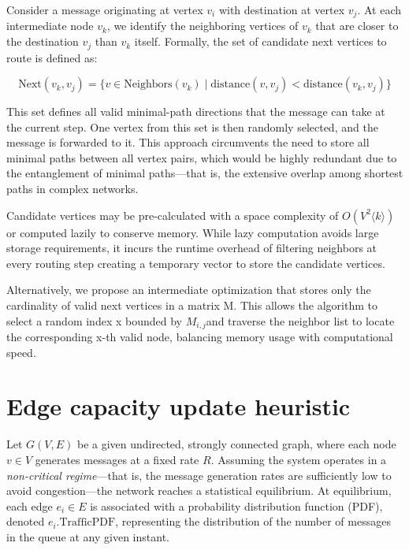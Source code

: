 \documentclass{article}
\begin{document}
Consider a message originating at vertex $ v_i $ with destination at vertex $ v_j $. At each intermediate node $ v_k $, we identify the neighboring vertices of $ v_k $ that are closer to the destination $ v_j $ than $ v_k $ itself. Formally, the set of candidate next vertices to route is defined as:

\begin{equation}
    \text{Next}(v_k, v_j) = \{v \in \text{Neighbors}(v_k) \mid \text{distance}(v, v_j) < \text{distance}(v_k, v_j)\}
\end{equation}

This set defines all valid minimal-path directions that the message can take at the current step. One vertex from this set is then randomly selected, and the message is forwarded to it.
This approach circumvents the need to store all minimal paths between all vertex pairs, which would be highly redundant due to the entanglement of minimal paths—that is, the extensive overlap among shortest paths in complex networks.

Candidate vertices may be pre-calculated with a space complexity of $O(V^2⟨k⟩)$ or computed lazily to conserve memory. While lazy computation avoids large storage requirements, it incurs the runtime overhead of filtering neighbors at every routing step creating a temporary vector to store the candidate vertices. 

Alternatively, we propose an intermediate optimization that stores only the cardinality of valid next vertices in a matrix M.  This allows the algorithm to select a random index x bounded by $M_{i,j}$​ and traverse the neighbor list to locate the corresponding x-th valid node, balancing memory usage with computational speed.


\section{Edge capacity update heuristic}

Let $ G(V, E)$ be a given undirected, strongly connected graph, where each node $v \in V$  generates messages at a fixed rate $R$. Assuming the system operates in a \emph{non-critical regime}—that is, the message generation rates are sufficiently low to avoid congestion—the network reaches a statistical equilibrium. At equilibrium, each edge $ e_i \in E $ is associated with a probability distribution function (PDF), denoted $e_i.\text{TrafficPDF}$, representing the distribution of the number of messages in the queue at any given instant.
\end{document}
